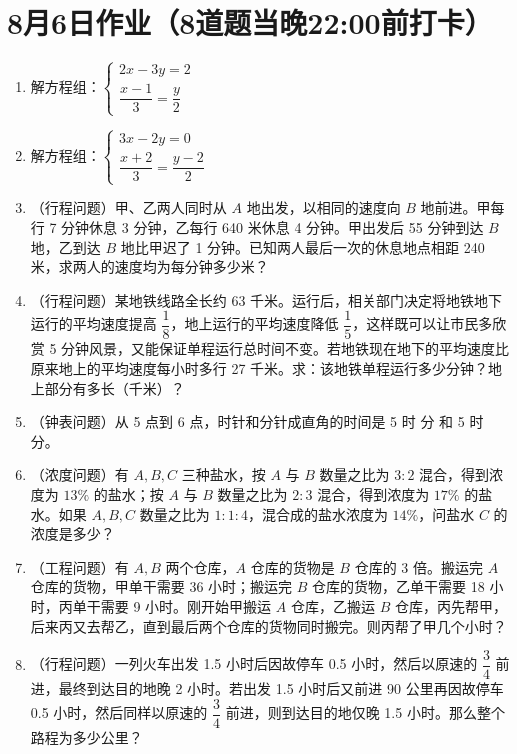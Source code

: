 \documentclass[UTF8,12pt,a4paper]{ctexart}
\newcommand{\BottomWriteSpace}{0.5cm}
\newenvironment{OnePageEightFill}{
  \small
  \vspace*{0pt}
  \begin{enumerate}[leftmargin=*, itemsep=0pt, topsep=0pt, parsep=0pt, partopsep=0pt]
  \setlength{\parskip}{0pt}
}{
  \end{enumerate}
  \vspace*{\BottomWriteSpace}
  \normalsize
  \newpage
}
\newcommand{\Q}[1]{\item #1\par\vfill}
\newcommand{\Qlast}[1]{\item #1\par}
\begin{document}
\section*{8月6日作业（8道题当晚22:00前打卡）}
\begin{OnePageEightFill}

\Q{解方程组：$\begin{cases} 2x - 3y = 2 \\ \dfrac{x-1}{3} = \dfrac{y}{2} \end{cases}$}

\Q{解方程组：$\begin{cases} 3x - 2y = 0 \\ \dfrac{x+2}{3} = \dfrac{y-2}{2} \end{cases}$}

\Q{（行程问题）甲、乙两人同时从 $A$ 地出发，以相同的速度向 $B$ 地前进。甲每行 7 分钟休息 3 分钟，乙每行 640 米休息 4 分钟。甲出发后 55 分钟到达 $B$ 地，乙到达 $B$ 地比甲迟了 1 分钟。已知两人最后一次的休息地点相距 240 米，求两人的速度均为每分钟多少米？}

\Q{（行程问题）某地铁线路全长约 63 千米。运行后，相关部门决定将地铁地下运行的平均速度提高 $\dfrac{1}{8}$，地上运行的平均速度降低 $\dfrac{1}{5}$，这样既可以让市民多欣赏 5 分钟风景，又能保证单程运行总时间不变。若地铁现在地下的平均速度比原来地上的平均速度每小时多行 27 千米。求：该地铁单程运行多少分钟？地上部分有多长（千米）？}

\Q{（钟表问题）从 5 点到 6 点，时针和分针成直角的时间是 5 时 \underline{\hspace{3em}} 分 和 5 时 \underline{\hspace{3em}} 分。}

\Q{（浓度问题）有 $A, B, C$ 三种盐水，按 $A$ 与 $B$ 数量之比为 $3:2$ 混合，得到浓度为 $13\%$ 的盐水；按 $A$ 与 $B$ 数量之比为 $2:3$ 混合，得到浓度为 $17\%$ 的盐水。如果 $A, B, C$ 数量之比为 $1:1:4$，混合成的盐水浓度为 $14\%$，问盐水 $C$ 的浓度是多少？}

\Q{（工程问题）有 $A, B$ 两个仓库，$A$ 仓库的货物是 $B$ 仓库的 3 倍。搬运完 $A$ 仓库的货物，甲单干需要 36 小时；搬运完 $B$ 仓库的货物，乙单干需要 18 小时，丙单干需要 9 小时。刚开始甲搬运 $A$ 仓库，乙搬运 $B$ 仓库，丙先帮甲，后来丙又去帮乙，直到最后两个仓库的货物同时搬完。则丙帮了甲几个小时？}

\Qlast{（行程问题）一列火车出发 1.5 小时后因故停车 0.5 小时，然后以原速的 $\dfrac{3}{4}$ 前进，最终到达目的地晚 2 小时。若出发 1.5 小时后又前进 90 公里再因故停车 0.5 小时，然后同样以原速的 $\dfrac{3}{4}$ 前进，则到达目的地仅晚 1.5 小时。那么整个路程为多少公里？}

\end{OnePageEightFill}
\end{document}

